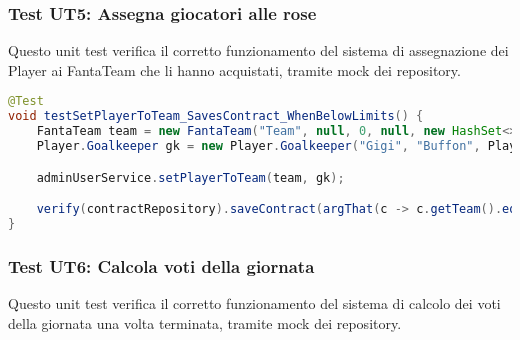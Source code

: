 \subsubsection{Test UT5: Assegna giocatori alle rose} \label{UT5}

Questo unit test verifica il corretto funzionamento del sistema di assegnazione dei Player ai FantaTeam che li hanno acquistati,
tramite mock dei repository.

\begin{lstlisting}[language=Java]
@Test
void testSetPlayerToTeam_SavesContract_WhenBelowLimits() {
	FantaTeam team = new FantaTeam("Team", null, 0, null, new HashSet<>());
	Player.Goalkeeper gk = new Player.Goalkeeper("Gigi", "Buffon", Player.Club.JUVENTUS);

	adminUserService.setPlayerToTeam(team, gk);

	verify(contractRepository).saveContract(argThat(c -> c.getTeam().equals(team) && c.getPlayer().equals(gk)));
}
\end{lstlisting}


\subsubsection{Test UT6: Calcola voti della giornata} \label{UT6}

Questo unit test verifica il corretto funzionamento del sistema di calcolo dei voti della giornata una volta terminata,
tramite mock dei repository.

